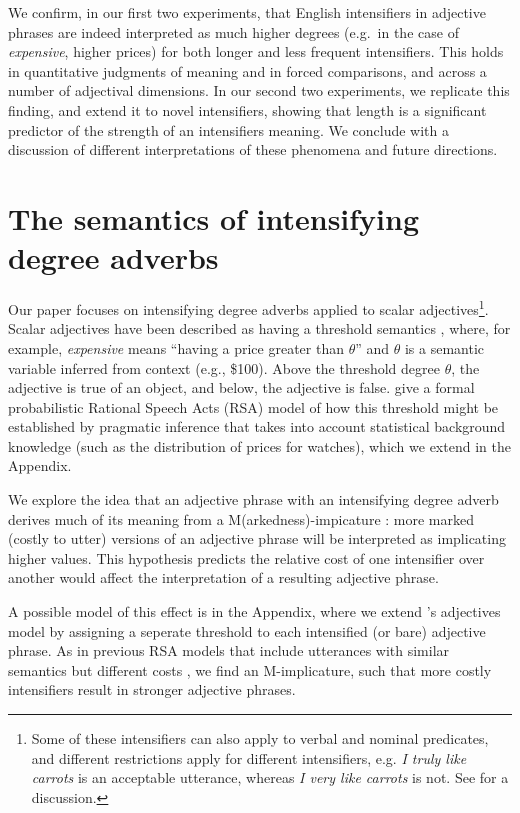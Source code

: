 \documentclass[10pt,letterpaper]{article}
\newcommand{\w}[1]{\emph{#1}}
\begin{document}
We confirm, in our first two experiments, that English intensifiers in adjective phrases are indeed interpreted as much higher degrees (e.g.~in the case of \w{expensive}, higher prices) for both longer and less frequent intensifiers. This holds in quantitative judgments of meaning and in forced comparisons, and across a number of adjectival dimensions. In our second two experiments, we replicate this finding, and extend it to novel intensifiers, showing that length is a significant predictor of the strength of an intensifiers meaning. We conclude with a discussion of different interpretations of these phenomena and future directions.

\section{The semantics of intensifying degree adverbs}

Our paper focuses on intensifying degree adverbs applied to scalar adjectives\footnote{Some of these intensifiers can also apply to verbal and nominal predicates, and different restrictions apply for different intensifiers, e.g. \w{I truly like carrots} is an acceptable utterance, whereas \w{I very like carrots} is not. See  for a discussion.}. Scalar adjectives have been described as having a threshold semantics \cite{kennedy}, where, for example, \w{expensive} means ``having a price greater than $\theta$'' and $\theta$ is a semantic variable inferred from context (e.g., \$100). Above the threshold degree $\theta$, the adjective is true of an object, and below, the adjective is false.  give a formal probabilistic Rational Speech Acts (RSA) \cite{frank,goodman} model of how this threshold might be established by pragmatic inference that takes into account statistical background knowledge (such as the distribution of prices for watches), which we extend in the Appendix.

We explore the idea that an adjective phrase with an intensifying degree adverb derives much of its meaning from a M(arkedness)-impicature \cite{levinson}: more marked (costly to utter) versions of an adjective phrase will be interpreted as implicating higher values. This hypothesis predicts the relative cost of one intensifier over another would affect the interpretation of a resulting adjective phrase.

A possible model of this effect is in the Appendix, where we extend 's adjectives model by assigning a seperate threshold to each intensified (or bare) adjective phrase. As in previous RSA models that include utterances with similar semantics but different costs \cite{bergen}, we find an M-implicature, such that more costly intensifiers result in stronger adjective phrases.
\end{document}
